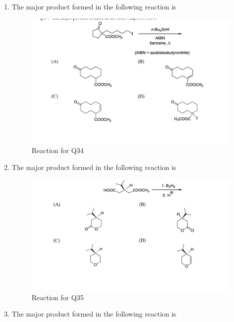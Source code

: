 \documentclass[journal,12pt,onecolumn]{IEEEtran}
\theoremstyle{remark}
\begin{document}
\begin{enumerate}
\item The major product formed in the following reaction is \hfill{}

\begin{figure}[H]
    \centering
    \includegraphics[width=0.8\linewidth]{figs/image12.png}
    \caption{Reaction for Q34}
    \label{fig:q34}
\end{figure}

\item The major product formed in the following reaction is \hfill{}

\begin{figure}[H]
    \centering
    \includegraphics[width=0.7\linewidth]{figs/image13.png}
    \caption{Reaction for Q35}
    \label{fig:q35}
\end{figure}








\item The major product formed in the following reaction is \hfill{}


\end{enumerate}
\end{document}
